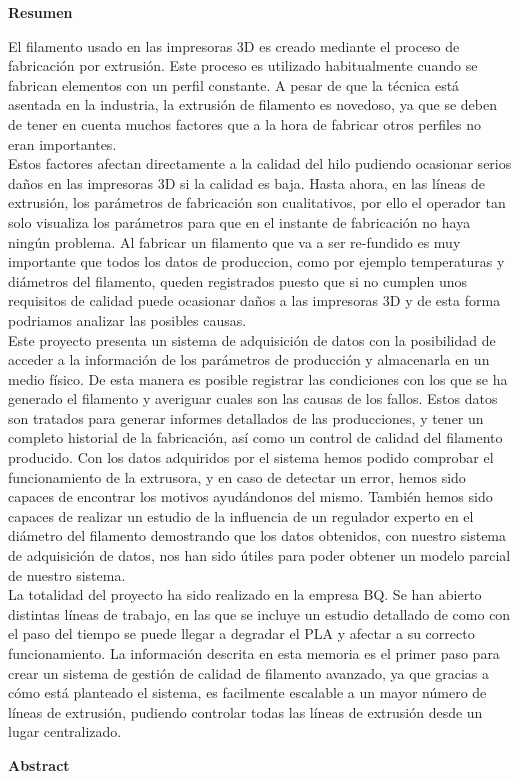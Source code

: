 
\thispagestyle{empty}
\begin{center}
    \Large
    \vspace{0.9cm}
    \textbf{Resumen}
\end{center}

El filamento usado en las impresoras 3D es creado mediante el proceso de fabricación por extrusión. Este proceso es utilizado habitualmente cuando se fabrican elementos con un perfil constante. A pesar de que la técnica está asentada en la industria, la extrusión de filamento es novedoso, ya que se deben de tener en cuenta muchos factores que a la hora de fabricar otros perfiles no eran importantes.\\

Estos factores afectan directamente a la calidad del hilo pudiendo ocasionar serios daños en las impresoras 3D si la calidad es baja. Hasta ahora, en las líneas de extrusión, los parámetros de fabricación son cualitativos, por ello el operador tan solo visualiza los parámetros para que en el instante de fabricación no haya ningún problema. Al fabricar un filamento que va a ser re-fundido es muy importante que todos los datos de produccion, como por ejemplo temperaturas y diámetros del filamento, queden registrados puesto que si no cumplen unos requisitos de calidad puede ocasionar daños a las impresoras 3D y de esta forma podriamos analizar las posibles causas.\\

Este proyecto presenta un sistema de adquisición de datos con la posibilidad de acceder a la información de los parámetros de producción y almacenarla en un medio físico. De esta manera es posible registrar las condiciones con los que se ha generado el filamento y averiguar cuales son las causas de los fallos. Estos datos son tratados para generar informes detallados de las producciones, y tener un completo historial de la fabricación, así como un control de calidad del filamento producido. Con los datos adquiridos por el sistema hemos podido comprobar el funcionamiento de la extrusora, y en caso de detectar un error, hemos sido capaces de encontrar los motivos ayudándonos del mismo. También hemos sido capaces de realizar un estudio de la influencia de un regulador experto en el diámetro del filamento demostrando que los datos obtenidos, con nuestro sistema de adquisición de datos, nos han sido útiles para poder obtener un modelo parcial de nuestro sistema.\\

La totalidad del proyecto ha sido realizado en la empresa BQ. Se han abierto distintas líneas de trabajo, en las que se incluye un estudio detallado de como con el paso del tiempo se puede llegar a degradar el PLA y afectar a su correcto funcionamiento. La información descrita en esta memoria es el primer paso para crear un sistema de gestión de calidad de filamento avanzado, ya que gracias a cómo está planteado el sistema, es facilmente escalable a un mayor número de líneas de extrusión, pudiendo controlar todas las líneas de extrusión desde un lugar centralizado.
\newpage{}
\begin{center}
    \Large
    \vspace{0.9cm}
    \textbf{Abstract}
\end{center}


